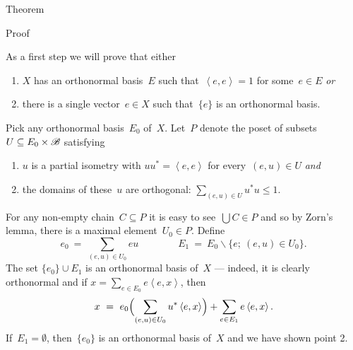 \begin{parsec}
\begin{point}{Theorem}
\begin{point}{Proof}
\begin{point}
As a first step we will prove that
either
\begin{enumerate}
\item $X$ has an orthonormal basis~$E$
    such that~$\left<e,e\right>=1$ for some~$e \in E$ \emph{or}
\item there is a single vector~$e \in X$ such that~$\{e\}$ is an orthonormal basis.
\end{enumerate}
Pick any orthonormal basis~$E_0$ of~$X$.
Let~$P$ denote the poset of subsets~$U \subseteq E_0 \times \mathscr{B}$
    satisfying
\begin{enumerate}
    \item
    $u$ is a partial isometry with $uu^* = \left<e,e\right>$
        for every~$(e,u) \in U$ \emph{and}
    \item
    the domains of these~$u$ are orthogonal:  $\sum_{(e,u) \in U} u^*u \leq 1$.
\end{enumerate}
For any non-empty chain~$C \subseteq P$
    it is easy to see~$\bigcup C \in P$
    and so by Zorn's lemma,
    there is a maximal element~$U_0 \in P$.
Define
\begin{equation*}
e_0 \ =\  \sum_{(e,u) \in U_0} eu
    \qquad \qquad E_1 \ = \ E_0 \backslash \{e;\ (e,u) \in U_0\}.
\end{equation*}
The set $\{e_0\} \cup E_1$ is an orthonormal basis of~$X$
    --- indeed, it is clearly orthonormal and
    if $x = \sum_{e \in E_0} e \left<e,x\right>$,
    then
\begin{equation*}
    x \ =\  e_0 \Bigl(\sum_{(e,u) \in U_0} u^*\left<e,x\right>\Bigr)
            + \sum_{e \in E_1} e\left<e,x\right>.
\end{equation*}
If~$E_1 = \emptyset$, then~$\{e_0\}$ is an orthonormal basis of~$X$ and
    we have shown point 2.


\end{point}
\end{point}
\end{point}
\end{parsec}
